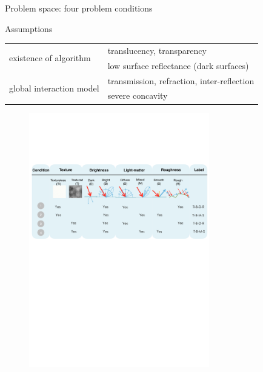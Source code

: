 \documentclass[10pt]{beamer}
\begin{document}
\begin{frame}{Problem space: four problem conditions}

\begin{exampleblock}{Assumptions}
\begin{table}
\centering
\begin{tabular}{ll}
\multirow{2}{*}{existence of algorithm} & translucency, transparency \\
& low surface reflectance (dark surfaces) \\ \cline{1-2}
\multirow{2}{*}{global interaction model} & transmission, refraction, inter-reflection \\
& severe concavity \\
\end{tabular}
\end{table}

\end{exampleblock}

\begin{figure}[h]
\includegraphics[width=0.7\textwidth]{prob_space/prob_cond}
\end{figure}

\end{frame}

\end{document}
